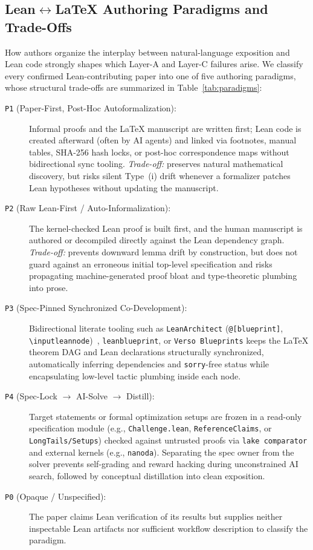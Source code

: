 \documentclass[11pt,letterpaper]{article}
\begin{document}
\subsection{Lean\texorpdfstring{$\leftrightarrow$\LaTeX{}}{<->LaTeX} Authoring Paradigms and Trade-Offs}
How authors organize the interplay between natural-language exposition and Lean code strongly shapes which Layer-A and Layer-C failures arise. We classify every confirmed Lean-contributing paper into one of five authoring paradigms, whose structural trade-offs are summarized in Table~\ref{tab:paradigms}:
\begin{description}
  \item[\texttt{P1} (Paper-First, Post-Hoc Autoformalization):] Informal proofs and the \LaTeX{} manuscript are written first; Lean code is created afterward (often by AI agents) and linked via footnotes, manual tables, SHA-256 hash locks, or post-hoc correspondence maps without bidirectional sync tooling. \emph{Trade-off:} preserves natural mathematical discovery, but risks silent Type~(i) drift whenever a formalizer patches Lean hypotheses without updating the manuscript.
  \item[\texttt{P2} (Raw Lean-First / Auto-Informalization):] The kernel-checked Lean proof is built first, and the human manuscript is authored or decompiled directly against the Lean dependency graph. \emph{Trade-off:} prevents downward lemma drift by construction, but does not guard against an erroneous initial top-level specification and risks propagating machine-generated proof bloat and type-theoretic plumbing into prose.
  \item[\texttt{P3} (Spec-Pinned Synchronized Co-Development):] Bidirectional literate tooling such as \texttt{LeanArchitect} (\texttt{@[blueprint]}, \texttt{\textbackslash inputleannode})~\cite{zhu2026leanarchitect}, \texttt{leanblueprint}, or \texttt{Verso Blueprints} keeps the \LaTeX{} theorem DAG and Lean declarations structurally synchronized, automatically inferring dependencies and \texttt{sorry}-free status while encapsulating low-level tactic plumbing inside each node.
  \item[\texttt{P4} (Spec-Lock $\rightarrow$ AI-Solve $\rightarrow$ Distill):] Target statements or formal optimization setups are frozen in a read-only specification module (e.g., \texttt{Challenge.lean}, \texttt{ReferenceClaims}, or \texttt{LongTails/Setups}) checked against untrusted proofs via \texttt{lake comparator} and external kernels (e.g., \texttt{nanoda}). Separating the spec owner from the solver prevents self-grading and reward hacking during unconstrained AI search, followed by conceptual distillation into clean exposition.
  \item[\texttt{P0} (Opaque / Unspecified):] The paper claims Lean verification of its results but supplies neither inspectable Lean artifacts nor sufficient workflow description to classify the paradigm.
\end{description}
\end{document}
